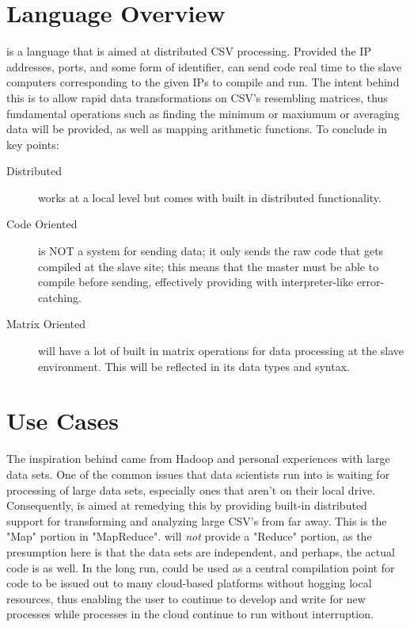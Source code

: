 \documentclass[10pt]{article}
\title{\name}
\author{PLT Group}
\begin{document}
\maketitle

\section{Language Overview}
    \name is a language that is aimed at distributed CSV processing. Provided the IP addresses, ports, and some form of identifier, \name can send code real time to the slave computers corresponding to the given IPs to compile and run. The intent behind this is to allow rapid data transformations on CSV's resembling matrices, thus fundamental operations such as finding the minimum or maxiumum or averaging data will be provided, as well as mapping arithmetic functions. To conclude in key points:
    \begin{description}
    \item[Distributed] \name works at a local level but comes with built in distributed functionality.
    \item[Code Oriented] \name is NOT a system for sending data; it only sends the raw code that gets compiled at the slave site; this means that the master must be able to compile before sending, effectively providing \name with interpreter-like error-catching.
    \item[Matrix Oriented] \name will have a lot of built in matrix operations for data processing at the slave environment. This will be reflected in its data types and syntax.
    \end{description}
    
\section{Use Cases}
	The inspiration behind \name came from Hadoop and personal experiences with large data sets. One of the common issues that data scientists run into is waiting for processing of large data sets, especially ones that aren't on their local drive. Consequently, \name is aimed at remedying this by providing built-in distributed support for transforming and analyzing large CSV's from far away. This is the "Map" portion in "MapReduce". \name will \emph{not} provide a "Reduce" portion, as the presumption here is that the data sets are independent, and perhaps, the actual code is as well.
    In the long run, \name could be used as a central compilation point for code to be issued out to many cloud-based platforms without hogging local resources, thus enabling the user to continue to develop and write for new processes while processes in the cloud continue to run without interruption.
    
\end{document}
